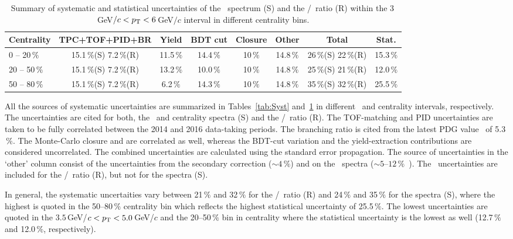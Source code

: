 \begin{table}[!htb]
\caption[Summary of systematic and statistical uncertainties of the \Lambdac\ spectrum and the \Lambdac/\dzero\ ratio in different centrality bins.]{\label{tab:SystCent} Summary of systematic and statistical uncertainties of the \Lambdac\ spectrum (S) and the \Lambdac/\dzero\ ratio (R) within the 3$\,$GeV$/c < {p_{\mathrm{T}}} < 6\,$GeV$/c$ interval in different centrality bins.}

\hspace{-6ex}\begin{tabular}{lccccccc}
\toprule
Centrality & TPC+TOF+PID+BR & Yield & BDT cut & Closure & Other & Total & Stat.\\
\midrule
0  -- 20$\,\%$ & 15.1$\,\%$(S)  7.2$\,\%$(R) & 11.5$\,\%$ &14.4$\,\%$ &10$\,\%$ &14.8$\,\%$ & 26$\,\%$(S)  22$\,\%$(R) & 15.3$\,\%$ \\
20 -- 50$\,\%$ & 15.1$\,\%$(S)  7.2$\,\%$(R) & 13.2$\,\%$ &10.0$\,\%$ &10$\,\%$ &14.8$\,\%$ & 25$\,\%$(S)  21$\,\%$(R) & 12.0$\,\%$ \\
50 -- 80$\,\%$ & 15.1$\,\%$(S)  7.2$\,\%$(R) &  6.2$\,\%$ &14.3$\,\%$ &10$\,\%$ &14.8$\,\%$ & 35$\,\%$(S)  32$\,\%$(R) & 25.5$\,\%$ \\

\bottomrule
\end{tabular}
\end{table}

All the sources of systematic uncertainties are summarized in Tables~\ref{tab:Syst} and~\ref{tab:SystCent} in different \pt\ and centrality intervals, respectively. The uncertainties are cited for both, the \pt\ and centrality spectra (S) and the \Lambdac/\dzero\ ratio (R)\@. The TOF-matching and PID uncertainties are taken to be fully correlated between the 2014 and 2016 data-taking periods. The branching ratio is cited from the latest PDG value~\cite{PDG} of 5.3$\,\%$\@. The Monte-Carlo closure and are correlated as well, whereas the BDT-cut variation and the yield-extraction contributions are considered uncorrelated. The combined uncertainties are calculated using the standard error propagation. The source of uncertainties in the `other' column consist of the uncertainties from the secondary correction ($\sim4\,\%$) and on the \dzero\ spectra ($\sim5$--$12\,\%$~\cite{D0paper})\@. The \dzero\ uncertainties are included for the \Lambdac/\dzero\ ratio (R), but not for the spectra (S)\@.

In general, the systematic uncertaities vary between 21$\,\%$ and 32$\,\%$ for the \Lambdac/\dzero\ ratio (R) and 24$\,\%$ and 35$\,\%$ for the spectra (S), where the highest is quoted in the 50--80$\,\%$ centrality bin which reflects the highest statistical uncertainty of 25.5$\,\%$\@. The lowest uncertainties are quoted in the $3.5\,$GeV/$c < {p_{\mathrm{T}}} < 5.0\,$GeV/$c$ and the 20--50$\,\%$ bin in centrality where the statistical uncertainty is the lowest as well (12.7$\,\%$ and 12.0$\,\%$, respectively).






